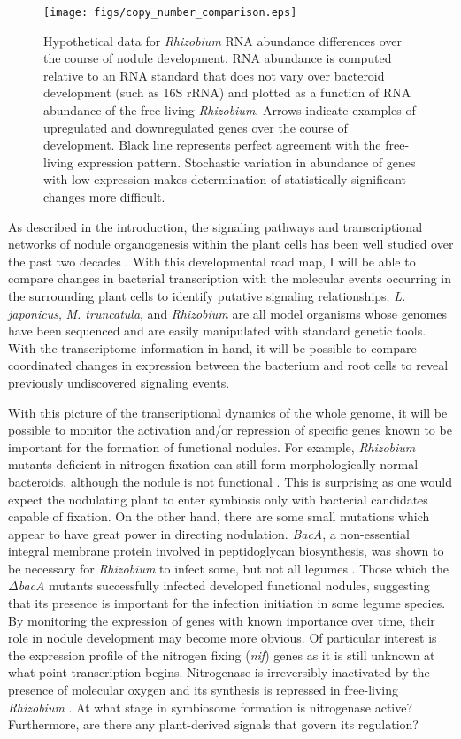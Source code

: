 \begin{figure}
	\centerline{\texttt{[image: figs/copy\_number\_comparison.eps]}}
	\caption{Hypothetical data for \textit{Rhizobium} RNA abundance differences over the course of
		nodule development. RNA abundance is computed relative to an RNA
		standard that does not vary over bacteroid development (such as
		16S rRNA) and plotted as a function of RNA abundance of the
		free-living \textit{Rhizobium}.  Arrows indicate examples of
		upregulated and downregulated genes over the course of
		development. Black line represents perfect agreement with the
		free-living expression pattern.
		Stochastic variation in abundance of genes with low expression makes
		determination of statistically significant changes more difficult.}
 \label{fig:fake_data}
\end{figure}
As described in the introduction, the signaling pathways
and transcriptional networks of nodule organogenesis within the plant cells has
been well studied over the past two decades \cite{Oldroyd:2004dv,
Soyano:2014ic}. With this developmental road map, I will be able to compare
changes in bacterial transcription with the molecular events occurring in the
surrounding plant cells to identify putative signaling relationships.
\textit{L. japonicus}, \textit{M. truncatula}, and \textit{Rhizobium} are all
model organisms whose genomes have been sequenced and are easily manipulated
with standard genetic tools. With the transcriptome information in hand, it will
be possible to compare coordinated changes in expression between the bacterium and
root cells to reveal previously undiscovered signaling events.


With this picture of the transcriptional
dynamics of the whole genome, it will be possible to monitor the
activation and/or repression of specific genes known to be important for the
formation of functional nodules.  For example, \textit{Rhizobium} mutants
deficient in nitrogen fixation can still form morphologically normal bacteroids,
although the nodule is not functional \cite{Hirsch:1987ux, Lang:2015wt}. This is
surprising as one would expect the nodulating plant to enter symbiosis only with
bacterial candidates capable of fixation. On the other hand, there are some
small mutations which appear to have great power in directing nodulation.
\textit{BacA}, a non-essential integral membrane protein involved in
peptidoglycan biosynthesis, was shown to be necessary for \textit{Rhizobium} to
infect some, but not all legumes \cite{Karunakaran:2010gr}. Those which the
$\Delta$\textit{bacA} mutants successfully infected developed 
functional nodules, suggesting that its presence is important for the infection
initiation in some legume species. By monitoring the expression of genes with
known importance over time, their role in nodule development may become more
obvious.  Of particular interest is the expression profile of the nitrogen
fixing (\textit{nif}) genes as it is still unknown at what point transcription
begins.  Nitrogenase is irreversibly inactivated by the presence of molecular
oxygen \cite{Gallon:1981uq} and its synthesis is repressed in free-living
\textit{Rhizobium} \cite{Merrick:1995tf}.  At what stage in symbiosome formation
is nitrogenase active? Furthermore, are there any plant-derived signals that
govern its regulation? 

